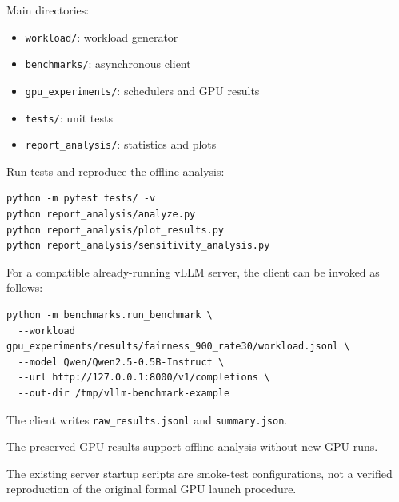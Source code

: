 \documentclass[sigplan,nonacm]{acmart}
\begin{document}
Main directories:

\begin{itemize}
\item \texttt{workload/}: workload generator
\item \texttt{benchmarks/}: asynchronous client
\item \texttt{gpu\_experiments/}: schedulers and GPU results
\item \texttt{tests/}: unit tests
\item \texttt{report\_analysis/}: statistics and plots
\end{itemize}

Run tests and reproduce the offline analysis:

\begin{lstlisting}
python -m pytest tests/ -v
python report_analysis/analyze.py
python report_analysis/plot_results.py
python report_analysis/sensitivity_analysis.py
\end{lstlisting}

For a compatible already-running vLLM server,
the client can be invoked as follows:

\begin{lstlisting}
python -m benchmarks.run_benchmark \
  --workload gpu_experiments/results/fairness_900_rate30/workload.jsonl \
  --model Qwen/Qwen2.5-0.5B-Instruct \
  --url http://127.0.0.1:8000/v1/completions \
  --out-dir /tmp/vllm-benchmark-example
\end{lstlisting}

The client writes \texttt{raw\_results.jsonl}
and \texttt{summary.json}.

The preserved GPU results support offline
analysis without new GPU runs.

The existing server startup scripts are
smoke-test configurations, not a verified
reproduction of the original formal GPU
launch procedure.
\end{document}
